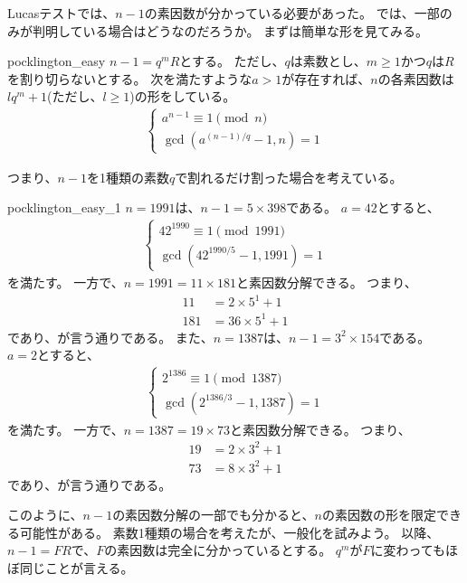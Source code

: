 Lucasテストでは、$n-1$の素因数が分かっている必要があった。
では、一部のみが判明している場合はどうなのだろうか。
まずは簡単な形を見てみる。

\begin{Theo}{}{pocklington_easy}
$n-1=q^mR$とする。
ただし、$q$は素数とし、$m\ge1$かつ$q$は$R$を割り切らないとする。
次を満たすような$a>1$が存在すれば、$n$の各素因数は$lq^m+1$(ただし、$l\ge1$)の形をしている。
\begin{align*}
\begin{cases}
a^{n-1} \equiv 1 \pmod{n}\\
\gcd(a^{(n-1)/q}-1, n) = 1
\end{cases}
\end{align*}
\end{Theo}

つまり、$n-1$を1種類の素数$q$で割れるだけ割った場合を考えている。

\begin{Exam}{}{pocklington_easy_1}
$n = 1991$は、$n-1=5\times398$である。
$a=42$とすると、
\begin{align*}
\begin{cases}
42^{1990} \equiv 1 \pmod{1991}\\
\gcd(42^{1990 / 5} - 1, 1991) = 1
\end{cases}
\end{align*}
を満たす。
一方で、$n=1991=11\times181$と素因数分解できる。
つまり、
\begin{align*}
11 &= 2 \times 5^1 + 1\\
181 &= 36 \times 5^1 + 1
\end{align*}
であり、が言う通りである。
また、$n = 1387$は、$n-1=3^2\times154$である。
$a=2$とすると、
\begin{align*}
\begin{cases}
2^{1386} \equiv 1 \pmod{1387}\\
\gcd(2^{1386 / 3} - 1, 1387) = 1
\end{cases}
\end{align*}
を満たす。
一方で、$n=1387=19\times73$と素因数分解できる。
つまり、
\begin{align*}
19 &= 2 \times 3^2 + 1\\
73 &= 8 \times 3^2 + 1
\end{align*}
であり、が言う通りである。
\end{Exam}

このように、$n-1$の素因数分解の一部でも分かると、$n$の素因数の形を限定できる可能性がある。
素数1種類の場合を考えたが、一般化を試みよう。
以降、$n-1=FR$で、$F$の素因数は完全に分かっているとする。
$q^m$が$F$に変わってもほぼ同じことが言える。

